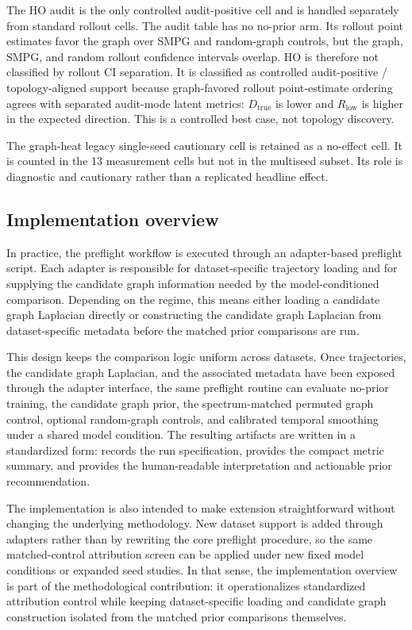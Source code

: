 \documentclass[preprint,12pt]{elsarticle}
\begin{document}
The HO audit is the only controlled audit-positive cell and is handled separately from standard rollout cells. The audit table has no no-prior arm. Its rollout point estimates favor the graph over SMPG and random-graph controls, but the graph, SMPG, and random rollout confidence intervals overlap. HO is therefore not classified by rollout CI separation. It is classified as controlled audit-positive / topology-aligned support because graph-favored rollout point-estimate ordering agrees with separated audit-mode latent metrics: \(D_{\mathrm{true}}\) is lower and \(R_{\mathrm{low}}\) is higher in the expected direction. This is a controlled best case, not topology discovery.

The graph-heat legacy single-seed cautionary cell is retained as a no-effect cell. It is counted in the 13 measurement cells but not in the multiseed subset. Its role is diagnostic and cautionary rather than a replicated headline effect.

\subsection{Implementation overview}

In practice, the preflight workflow is executed through an adapter-based preflight script. Each adapter is responsible for dataset-specific trajectory loading and for supplying the candidate graph information needed by the model-conditioned comparison. Depending on the regime, this means either loading a candidate graph Laplacian directly or constructing the candidate graph Laplacian from dataset-specific metadata before the matched prior comparisons are run.

This design keeps the comparison logic uniform across datasets. Once trajectories, the candidate graph Laplacian, and the associated metadata have been exposed through the adapter interface, the same preflight routine can evaluate no-prior training, the candidate graph prior, the spectrum-matched permuted graph control, optional random-graph controls, and calibrated temporal smoothing under a shared model condition. The resulting artifacts are written in a standardized form:  records the run specification,  provides the compact metric summary, and  provides the human-readable interpretation and actionable prior recommendation.

The implementation is also intended to make extension straightforward without changing the underlying methodology. New dataset support is added through adapters rather than by rewriting the core preflight procedure, so the same matched-control attribution screen can be applied under new fixed model conditions or expanded seed studies. In that sense, the implementation overview is part of the methodological contribution: it operationalizes standardized attribution control while keeping dataset-specific loading and candidate graph construction isolated from the matched prior comparisons themselves.
\end{document}
